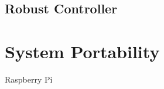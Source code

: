     \subsection{Robust Controller}

    


    \section{System Portability}
    \label{sec:portability}
    
        Raspberry Pi


\clearpage